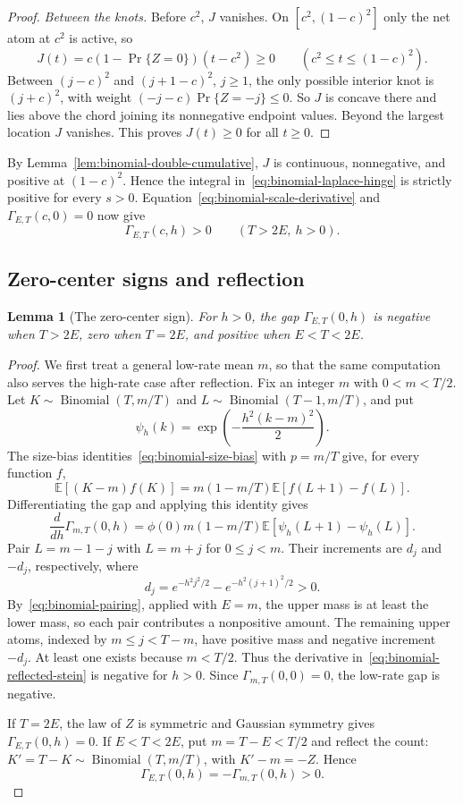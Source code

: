 \documentclass[11pt]{article}
\newtheorem{lemma}[theorem]{Lemma}
\theoremstyle{remark}
\newcommand{\E}{\mathbb E}
\begin{document}
\begin{proof}
\emph{Between the knots.} Before $c^2$, $J$ vanishes. On
$[c^2,(1-c)^2]$ only the net atom at $c^2$ is active, so
\[
 J(t)=c(1-\Pr\{Z=0\})(t-c^2)\geq0
 \qquad(c^2\leq t\leq(1-c)^2).
\]
Between $(j-c)^2$ and $(j+1-c)^2$, $j\geq1$, the only possible interior knot
is $(j+c)^2$, with weight $(-j-c)\Pr\{Z=-j\}\leq0$. So $J$ is concave there
and lies above the chord joining its nonnegative endpoint values. Beyond the
largest location $J$ vanishes. This proves $J(t)\geq0$ for all $t\geq0$.
\end{proof}

By Lemma~\ref{lem:binomial-double-cumulative}, $J$ is continuous,
nonnegative, and positive at $(1-c)^2$. Hence the integral
in~\eqref{eq:binomial-laplace-hinge} is strictly positive for every $s>0$.
Equation~\eqref{eq:binomial-scale-derivative} and
$\Gamma_{E,T}(c,0)=0$ now give
\begin{equation}\label{eq:binomial-low-boundary-strict}
 \Gamma_{E,T}(c,h)>0\qquad(T>2E,\ h>0).
\end{equation}

\subsection*{Zero-center signs and reflection}
\begin{lemma}[The zero-center sign]\label{lem:binomial-reflected-zero}
For $h>0$, the gap $\Gamma_{E,T}(0,h)$ is negative when $T>2E$, zero when
$T=2E$, and positive when $E<T<2E$.
\end{lemma}

\begin{proof}
We first treat a general low-rate mean $m$, so that the same computation also
serves the high-rate case after reflection. Fix an integer $m$ with
$0<m<T/2$. Let $K\sim\operatorname{Binomial}(T,m/T)$ and
$L\sim\operatorname{Binomial}(T-1,m/T)$, and put
\[
 \psi_h(k)=\exp\left(-\frac{h^2(k-m)^2}{2}\right).
\]
The size-bias identities~\eqref{eq:binomial-size-bias} with $p=m/T$ give,
for every function $f$,
\[
 \E[(K-m)f(K)]
 =m(1-m/T)\E[f(L+1)-f(L)].
\]
Differentiating the gap and applying this identity gives
\begin{equation}\label{eq:binomial-reflected-stein}
 \frac{d}{dh}\Gamma_{m,T}(0,h)
 =\phi(0)m(1-m/T)\E[\psi_h(L+1)-\psi_h(L)].
\end{equation}
Pair $L=m-1-j$ with $L=m+j$ for $0\leq j<m$. Their increments are $d_j$
and $-d_j$, respectively, where
\[
 d_j=e^{-h^2j^2/2}-e^{-h^2(j+1)^2/2}>0.
\]
By~\eqref{eq:binomial-pairing}, applied with $E=m$, the upper mass is at
least the lower mass, so each pair contributes a nonpositive amount.
The remaining upper atoms, indexed by $m\leq j<T-m$, have positive mass
and negative increment $-d_j$. At least one exists because $m<T/2$.
Thus the derivative in~\eqref{eq:binomial-reflected-stein} is negative for
$h>0$. Since $\Gamma_{m,T}(0,0)=0$, the low-rate gap is negative.

If $T=2E$, the law of $Z$ is symmetric and Gaussian symmetry gives
$\Gamma_{E,T}(0,h)=0$. If $E<T<2E$, put $m=T-E<T/2$ and reflect the count:
$K'=T-K\sim\operatorname{Binomial}(T,m/T)$, with $K'-m=-Z$. Hence
\[
 \Gamma_{E,T}(0,h)=-\Gamma_{m,T}(0,h)>0.
\]
\end{proof}
\end{document}
